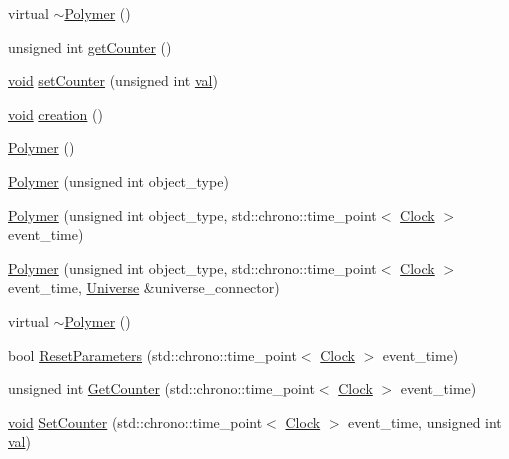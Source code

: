 \begin{DoxyCompactItemize}
virtual \mbox{\hyperlink{class_polymer_aac2b3983f375a5691c7d5ca1a79594d5}{$\sim$\+Polymer}} ()
\item 
unsigned int \mbox{\hyperlink{class_polymer_a8346d821e5f8690d7816ba1d40036b69}{get\+Counter}} ()
\item 
\mbox{\hyperlink{glad_8h_a950fc91edb4504f62f1c577bf4727c29}{void}} \mbox{\hyperlink{class_polymer_a7ed6bbe09a570b59f9253d63fd3326d2}{set\+Counter}} (unsigned int \mbox{\hyperlink{glad_8h_a26942fd2ed566ef553eae82d2c109c8f}{val}})
\item 
\mbox{\hyperlink{glad_8h_a950fc91edb4504f62f1c577bf4727c29}{void}} \mbox{\hyperlink{class_polymer_a1daba3eb2ba8428bf2f3e814668b155f}{creation}} ()
\item 
\mbox{\hyperlink{class_polymer_a0f7d915300bfec223c4025f8e9d4f46d}{Polymer}} ()
\item 
\mbox{\hyperlink{class_polymer_adb35b8b7a5eae1e39187c0e525b0d9b1}{Polymer}} (unsigned int object\+\_\+type)
\item 
\mbox{\hyperlink{class_polymer_af918b8776cfd76d9ae4611bf35d4192a}{Polymer}} (unsigned int object\+\_\+type, std\+::chrono\+::time\+\_\+point$<$ \mbox{\hyperlink{universe_8h_a0ef8d951d1ca5ab3cfaf7ab4c7a6fd80}{Clock}} $>$ event\+\_\+time)
\item 
\mbox{\hyperlink{class_polymer_a53797e297c95b3bd934e1b8dd8c0c399}{Polymer}} (unsigned int object\+\_\+type, std\+::chrono\+::time\+\_\+point$<$ \mbox{\hyperlink{universe_8h_a0ef8d951d1ca5ab3cfaf7ab4c7a6fd80}{Clock}} $>$ event\+\_\+time, \mbox{\hyperlink{class_universe}{Universe}} \&universe\+\_\+connector)
\item 
virtual \mbox{\hyperlink{class_polymer_aac2b3983f375a5691c7d5ca1a79594d5}{$\sim$\+Polymer}} ()
\item 
bool \mbox{\hyperlink{class_polymer_aa20f1e5c79e8631afa291569d5030103}{Reset\+Parameters}} (std\+::chrono\+::time\+\_\+point$<$ \mbox{\hyperlink{universe_8h_a0ef8d951d1ca5ab3cfaf7ab4c7a6fd80}{Clock}} $>$ event\+\_\+time)
\item 
unsigned int \mbox{\hyperlink{class_polymer_ac33903f9b5d2c73d6ddadcb02ece323e}{Get\+Counter}} (std\+::chrono\+::time\+\_\+point$<$ \mbox{\hyperlink{universe_8h_a0ef8d951d1ca5ab3cfaf7ab4c7a6fd80}{Clock}} $>$ event\+\_\+time)
\item 
\mbox{\hyperlink{glad_8h_a950fc91edb4504f62f1c577bf4727c29}{void}} \mbox{\hyperlink{class_polymer_a1500ffc682396af2f4306c7c7ea7fd87}{Set\+Counter}} (std\+::chrono\+::time\+\_\+point$<$ \mbox{\hyperlink{universe_8h_a0ef8d951d1ca5ab3cfaf7ab4c7a6fd80}{Clock}} $>$ event\+\_\+time, unsigned int \mbox{\hyperlink{glad_8h_a26942fd2ed566ef553eae82d2c109c8f}{val}})

\end{DoxyCompactItemize}
